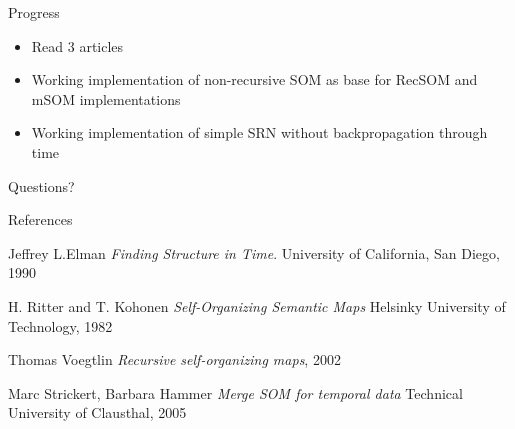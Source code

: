 \documentclass{article}
\begin{document}
\begin{frame}{Progress}

\begin{itemize}
\item Read 3 articles
\item Working implementation of non-recursive SOM as base for RecSOM and mSOM implementations
\item Working implementation of simple SRN without backpropagation through time
\end{itemize}

\end{frame}


{
\begin{frame}[standout]
  Questions?
\end{frame}
}

\appendix


\begin{frame}[allowframebreaks]{References}

  
  
  
\begin{thebibliography}{9}
Jeffrey L.Elman
\textit{Finding Structure in Time}. 
University of California, San Diego, 1990
 
H. Ritter and T. Kohonen
\textit{Self-Organizing Semantic Maps} 
Helsinky University of Technology, 1982
  
Thomas Voegtlin
\textit{Recursive self-organizing maps}, 2002
 
Marc Strickert, Barbara Hammer
\textit{Merge SOM for temporal data}
Technical University of Clausthal, 2005
 
\end{thebibliography}

\end{frame}
\end{document}
